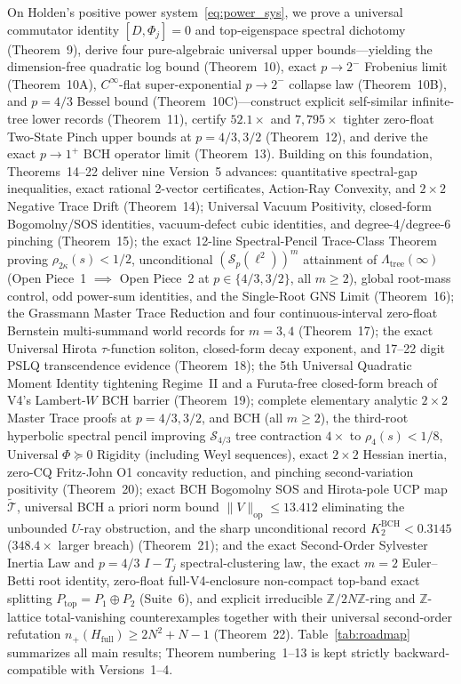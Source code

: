 \documentclass[10pt,letterpaper]{article}
\newcommand{\Sp}{\mathcal{S}_p}
\newcommand{\op}{\mathrm{op}}
\begin{document}
On Holden's positive power system~\eqref{eq:power_sys}, we prove a universal commutator identity $[D, \Phi_j] = 0$ and top-eigenspace spectral dichotomy (Theorem~9), derive four pure-algebraic universal upper bounds—yielding the dimension-free quadratic log bound (Theorem~10), exact $p \to 2^-$ Frobenius limit (Theorem~10A), $C^\infty$-flat super-exponential $p \to 2^-$ collapse law (Theorem~10B), and $p = 4/3$ Bessel bound (Theorem~10C)—construct explicit self-similar infinite-tree lower records (Theorem~11), certify $52.1\times$ and $7{,}795\times$ tighter zero-float Two-State Pinch upper bounds at $p = 4/3, 3/2$ (Theorem~12), and derive the exact $p \to 1^+$ BCH operator limit (Theorem~13). Building on this foundation, Theorems~14--22 deliver nine Version~5 advances: quantitative spectral-gap inequalities, exact rational 2-vector certificates, Action-Ray Convexity, and $2\times 2$ Negative Trace Drift (Theorem~14); Universal Vacuum Positivity, closed-form Bogomolny/SOS identities, vacuum-defect cubic identities, and degree-4/degree-6 pinching (Theorem~15); the exact 12-line Spectral-Pencil Trace-Class Theorem proving $\rho_{2\kappa}(s) < 1/2$, unconditional $(\Sp(\ell^2))^m$ attainment of $\Lambda_{\mathrm{tree}}(\infty)$ (Open Piece~1 $\implies$ Open Piece~2 at $p \in \{4/3, 3/2\}$, all $m \ge 2$), global root-mass control, odd power-sum identities, and the Single-Root GNS Limit (Theorem~16); the Grassmann Master Trace Reduction and four continuous-interval zero-float Bernstein multi-summand world records for $m = 3, 4$ (Theorem~17); the exact Universal Hirota $\tau$-function soliton, closed-form decay exponent, and 17--22 digit PSLQ transcendence evidence (Theorem~18); the 5th Universal Quadratic Moment Identity tightening Regime~II and a Furuta-free closed-form breach of V4's Lambert-$W$ BCH barrier (Theorem~19); complete elementary analytic $2\times 2$ Master Trace proofs at $p = 4/3, 3/2$, and BCH (all $m \ge 2$), the third-root hyperbolic spectral pencil improving $\mathcal{S}_{4/3}$ tree contraction $4\times$ to $\rho_4(s) < 1/8$, Universal $\Phi \succeq 0$ Rigidity (including Weyl sequences), exact $2\times 2$ Hessian inertia, zero-CQ Fritz-John O1 concavity reduction, and pinching second-variation positivity (Theorem~20); exact BCH Bogomolny SOS and Hirota-pole UCP map $\widetilde{\mathcal{T}}$, universal BCH a priori norm bound $\|V\|_{\op} \le 13.412$ eliminating the unbounded $U$-ray obstruction, and the sharp unconditional record $K_2^{\mathrm{BCH}} < 0.3145$ ($348.4\times$ larger breach) (Theorem~21); and the exact Second-Order Sylvester Inertia Law and $p = 4/3$ $I - T_j$ spectral-clustering law, the exact $m = 2$ Euler--Betti root identity, zero-float full-V4-enclosure non-compact top-band exact splitting $P_{\mathrm{top}} = P_1 \oplus P_2$ (Suite~6), and explicit irreducible $\mathbb{Z}/2N\mathbb{Z}$-ring and $\mathbb{Z}$-lattice total-vanishing counterexamples together with their universal second-order refutation $n_+(H_{\mathrm{full}}) \ge 2N^2 + N - 1$ (Theorem~22). Table~\ref{tab:roadmap} summarizes all main results; Theorem numbering~1--13 is kept strictly backward-compatible with Versions~1--4.
\end{document}
